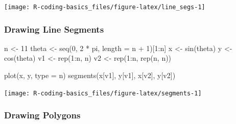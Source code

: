 \documentclass[
]{book}
\newenvironment{Shaded}{\begin{snugshade}}{\end{snugshade}}
\newcommand{\AttributeTok}[1]{\textcolor[rgb]{0.77,0.63,0.00}{#1}}
\newcommand{\DecValTok}[1]{\textcolor[rgb]{0.00,0.00,0.81}{#1}}
\newcommand{\FunctionTok}[1]{\textcolor[rgb]{0.00,0.00,0.00}{#1}}
\newcommand{\NormalTok}[1]{#1}
\newcommand{\OtherTok}[1]{\textcolor[rgb]{0.56,0.35,0.01}{#1}}
\newcommand{\SpecialCharTok}[1]{\textcolor[rgb]{0.00,0.00,0.00}{#1}}
\newcommand{\StringTok}[1]{\textcolor[rgb]{0.31,0.60,0.02}{#1}}
\begin{document}
\begin{center}\texttt{[image: R-coding-basics\_files/figure-latex/line\_segs-1]} \end{center}

\hypertarget{drawing-line-segments}{%
\subsubsection{Drawing Line Segments}\label{drawing-line-segments}}

\begin{Shaded}
\begin{Highlighting}[]
\NormalTok{n }\OtherTok{\textless{}{-}} \DecValTok{11}
\NormalTok{theta }\OtherTok{\textless{}{-}} \FunctionTok{seq}\NormalTok{(}\DecValTok{0}\NormalTok{, }\DecValTok{2} \SpecialCharTok{*}\NormalTok{ pi, }\AttributeTok{length =}\NormalTok{ n }\SpecialCharTok{+} \DecValTok{1}\NormalTok{)[}\DecValTok{1}\SpecialCharTok{:}\NormalTok{n]}
\NormalTok{x }\OtherTok{\textless{}{-}} \FunctionTok{sin}\NormalTok{(theta)}
\NormalTok{y }\OtherTok{\textless{}{-}} \FunctionTok{cos}\NormalTok{(theta)}
\NormalTok{v1 }\OtherTok{\textless{}{-}} \FunctionTok{rep}\NormalTok{(}\DecValTok{1}\SpecialCharTok{:}\NormalTok{n, n)}
\NormalTok{v2 }\OtherTok{\textless{}{-}} \FunctionTok{rep}\NormalTok{(}\DecValTok{1}\SpecialCharTok{:}\NormalTok{n, }\FunctionTok{rep}\NormalTok{(n, n))}

\FunctionTok{plot}\NormalTok{(x, y, }\AttributeTok{type =} \StringTok{\textquotesingle{}n\textquotesingle{}}\NormalTok{)}
\FunctionTok{segments}\NormalTok{(x[v1], y[v1], x[v2], y[v2])}
\end{Highlighting}
\end{Shaded}

\begin{center}\texttt{[image: R-coding-basics\_files/figure-latex/segments-1]} \end{center}

\hypertarget{drawing-polygons}{%
\subsubsection*{Drawing Polygons}\label{drawing-polygons}}

\begin{Shaded}
\end{Shaded}
\end{document}
